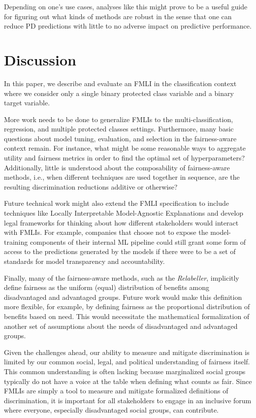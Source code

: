 \documentclass{{interact/interact}}
\begin{document}
Depending on one's use cases, analyses like this might prove to be a useful
guide for figuring out what kinds of methods are robust in the sense that one
can reduce PD predictions with little to no adverse
impact on predictive performance.

\section{Discussion}

In this paper, we describe and evaluate an FMLI in the classification context
where we consider only a single binary protected class variable and a binary
target variable.

More work needs to be done to generalize FMLIs to the multi-classification,
regression, and multiple protected classes settings. Furthermore, many basic
questions about model tuning, evaluation, and selection in the fairness-aware
context remain. For instance, what might be some reasonable ways to aggregate
utility and fairness metrics in order to find the optimal set of
hyperparameters? Additionally, little is understood about the composability of
fairness-aware methods, i.e., when different techniques are used together in
sequence, are the resulting discrimination reductions additive or otherwise?

Future technical work might also extend the FMLI specification to include
techniques like Locally Interpretable Model-Agnostic Explanations
\cite{ribeiro2016should} and develop legal frameworks for thinking about how
different stakeholders would interact with FMLIs. For example, companies that
choose not to expose the model-training components of their internal ML
pipeline could still grant some form of access to the predictions generated by
the models if there were to be a set of standards for model transparency and
accountability.

Finally, many of the fairness-aware methods, such as the \emph{Relabeller},
implicitly define fairness as the uniform (equal) distribution of benefits among
disadvantaged and advantaged groups. Future work would make this definition more
flexible, for example, by defining fairness as the proportional distribution of
benefits based on need. This would necessitate the mathematical formalization of
another set of assumptions about the needs of disadvantaged and advantaged
groups.

Given the challenges ahead, our ability to measure and mitigate discrimination
is limited by our common social, legal, and political understanding of fairness
itself. This common understanding is often lacking because marginalized social
groups typically do not have a voice at the table when defining what counts as
fair. Since FMLIs are simply a tool to measure and mitigate formalized
definitions of discrimination, it is important for all stakeholders to engage in
an inclusive forum where everyone, especially disadvantaged social groups, can
contribute.

\nocite{*}


\end{document}
